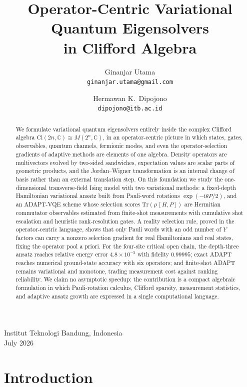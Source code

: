 \documentclass[11pt]{article}
\title{Operator-Centric Variational Quantum Eigensolvers\\ in Clifford Algebra}
\author{
Ginanjar Utama\\[-2pt]
\normalsize\texttt{ginanjar.utama@gmail.com}
\and
Hermawan K.\ Dipojono\\[-2pt]
\normalsize\texttt{dipojono@itb.ac.id}
}
\date{}
\newcommand{\Cl}{\mathrm{Cl}}
\newcommand{\C}{\mathbb{C}}
\newcommand{\Tr}{\mathrm{Tr}}
\newcommand{\ii}{\mathrm{i}}
\begin{document}
\maketitle
\begin{center}
\vspace{-1.5em}
\normalsize Institut Teknologi Bandung, Indonesia\\[2pt]
\normalsize July 2026
\end{center}

\begin{abstract}
We formulate variational quantum eigensolvers entirely inside the complex Clifford algebra $\Cl(2n,\C)\cong M(2^n,\C)$, in an operator-centric picture in which states, gates, observables, quantum channels, fermionic modes, and even the operator-selection gradients of adaptive methods are elements of one algebra.  Density operators are multivectors evolved by two-sided sandwiches, expectation values are scalar parts of geometric products, and the Jordan--Wigner transformation is an internal change of basis rather than an external translation step.  On this foundation we study the one-dimensional transverse-field Ising model with two variational methods: a fixed-depth Hamiltonian variational ansatz built from Pauli-word rotations $\exp(-\ii\theta P/2)$, and an ADAPT-VQE scheme whose selection scores $\Tr(\rho\,[H,P])$ are Hermitian commutator observables estimated from finite-shot measurements with cumulative shot escalation and heuristic rank-resolution gates.  A reality selection rule, proved in the operator-centric language, shows that only Pauli words with an odd number of $Y$ factors can carry a nonzero selection gradient for real Hamiltonians and real states, fixing the operator pool a priori.  For the four-site critical open chain, the depth-three ansatz reaches relative energy error $4.8\times10^{-5}$ with fidelity $0.99995$; exact ADAPT reaches numerical ground-state accuracy with six operators; and finite-shot ADAPT remains variational and monotone, trading measurement cost against ranking reliability.  We claim no asymptotic speedup: the contribution is a compact algebraic formulation in which Pauli-rotation calculus, Clifford sparsity, measurement statistics, and adaptive ansatz growth are expressed in a single computational language.
\end{abstract}

\section{Introduction}
\end{document}
